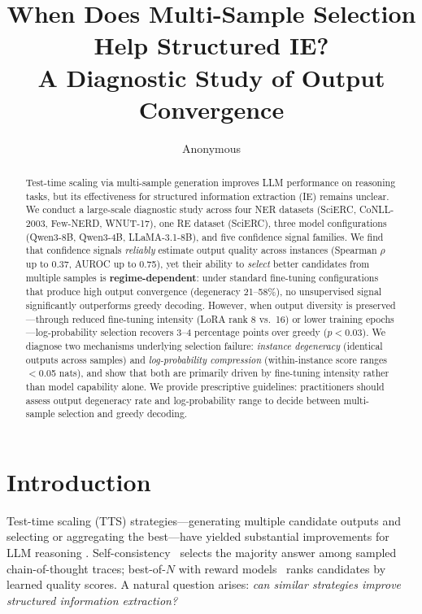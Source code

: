 \documentclass[11pt,a4paper]{article}
\title{When Does Multi-Sample Selection Help Structured IE?\\A Diagnostic Study of Output Convergence}
\author{Anonymous}
\date{}
\begin{document}
\maketitle

\begin{abstract}
Test-time scaling via multi-sample generation improves LLM performance on reasoning tasks, but its effectiveness for structured information extraction (IE) remains unclear.
We conduct a large-scale diagnostic study across four NER datasets (SciERC, CoNLL-2003, Few-NERD, WNUT-17), one RE dataset (SciERC), three model configurations (Qwen3-8B, Qwen3-4B, LLaMA-3.1-8B), and five confidence signal families.
We find that confidence signals \emph{reliably} estimate output quality across instances (Spearman $\rho$ up to 0.37, AUROC up to 0.75), yet their ability to \emph{select} better candidates from multiple samples is \textbf{regime-dependent}: under standard fine-tuning configurations that produce high output convergence (degeneracy 21--58\%), no unsupervised signal significantly outperforms greedy decoding.
However, when output diversity is preserved---through reduced fine-tuning intensity (LoRA rank 8 vs.\ 16) or lower training epochs---log-probability selection recovers 3--4 percentage points over greedy ($p<0.03$).
We diagnose two mechanisms underlying selection failure: \emph{instance degeneracy} (identical outputs across samples) and \emph{log-probability compression} (within-instance score ranges $<$0.05 nats), and show that both are primarily driven by fine-tuning intensity rather than model capability alone.
We provide prescriptive guidelines: practitioners should assess output degeneracy rate and log-probability range to decide between multi-sample selection and greedy decoding.
\end{abstract}

\section{Introduction}

Test-time scaling (TTS) strategies---generating multiple candidate outputs and selecting or aggregating the best---have yielded substantial improvements for LLM reasoning \citep{wang2023selfconsistency,brown2024tts,snell2024scaling}.
Self-consistency~\citep{wang2023selfconsistency} selects the majority answer among sampled chain-of-thought traces; best-of-$N$ with reward models~\citep{cobbe2021gsm8k,lightman2023lets} ranks candidates by learned quality scores.
A natural question arises: \emph{can similar strategies improve structured information extraction?}
\end{document}
